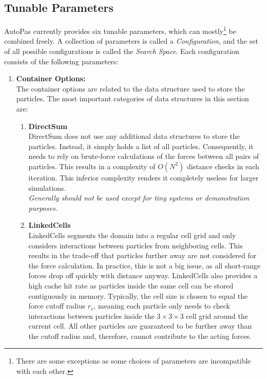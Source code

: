 \subsection{Tunable Parameters}

AutoPas currently provides six tunable parameters, which can mostly\footnote{There are some exceptions as some choices of parameters are incompatible with each other.} be combined freely. A collection of parameters is called a \emph{Configuration}, and the set of all possible configurations is called the \emph{Search Space}. Each configuration consists of the following parameters:

\begin{enumerate}[label=\textbf{\arabic*.}]
      \item \textbf{Container Options:} \\
            The container options are related to the data structure used to store the particles. The most important categories of data structures in this section are:
            \begin{enumerate}
                  \item \textbf{DirectSum} \\
                        DirectSum does not use any additional data structures to store the particles. Instead, it simply holds a list of all particles. Consequently, it needs to rely on brute-force calculations of the forces between all pairs of particles. This results in a complexity of $O(N^2)$ distance checks in each iteration. This inferior complexity renders it completely useless for larger simulations.\\
                        \textit{Generally should not be used except for tiny systems or demonstration purposes.~\cite{VICCIONE2008625}}
                  \item \textbf{LinkedCells} \\
                        LinkedCells segments the domain into a regular cell grid and only considers interactions between particles from neighboring cells. This results in the trade-off that particles further away are not considered for the force calculation. In practice, this is not a big issue, as all short-range forces drop off quickly with distance anyway.
                        LinkedCells also provides a high cache hit rate as particles inside the same cell can be stored contiguously in memory. Typically, the cell size is chosen to equal the force cutoff radius $r_c$, meaning each particle only needs to check interactions between particles inside the $3\times3\times3$ cell grid around the current cell. All other particles are guaranteed to be further away than the cutoff radius and, therefore, cannot contribute to the acting forces.

\end{enumerate}
\end{enumerate}
